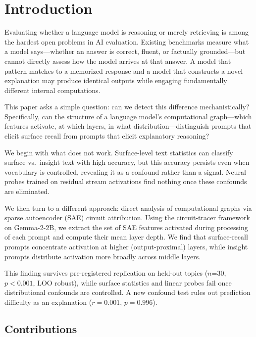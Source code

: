 \documentclass{article}
\begin{document}
\section{Introduction}

Evaluating whether a language model is reasoning or merely retrieving is among the hardest 
open problems in AI evaluation. Existing benchmarks measure what a model says---whether 
an answer is correct, fluent, or factually grounded---but cannot directly assess how the 
model arrives at that answer. A model that pattern-matches to a memorized response and a 
model that constructs a novel explanation may produce identical outputs while engaging 
fundamentally different internal computations.

This paper asks a simple question: can we detect this difference mechanistically? 
Specifically, can the structure of a language model's computational graph---which features 
activate, at which layers, in what distribution---distinguish prompts that elicit surface recall 
from prompts that elicit explanatory reasoning?

We begin with what does not work. Surface-level text statistics can classify surface vs.\ 
insight text with high accuracy, but this accuracy persists even when vocabulary is controlled, 
revealing it as a confound rather than a signal. Neural probes trained on residual stream 
activations find nothing once these confounds are eliminated.

We then turn to a different approach: direct analysis of computational graphs via sparse 
autoencoder (SAE) circuit attribution. Using the circuit-tracer framework \citep{lindsey2025} 
on Gemma-2-2B, we extract the set of SAE features activated during processing of each 
prompt and compute their mean layer depth. We find that surface-recall prompts concentrate 
activation at higher (output-proximal) layers, while insight prompts distribute activation more 
broadly across middle layers.

This finding survives pre-registered replication on held-out topics ($n$=30, $p < 0.001$, 
LOO robust), while surface statistics and linear probes fail once distributional confounds are 
controlled. A new confound test rules out prediction difficulty as an explanation 
($r = 0.001$, $p = 0.996$).

\subsection{Contributions}
\end{document}
